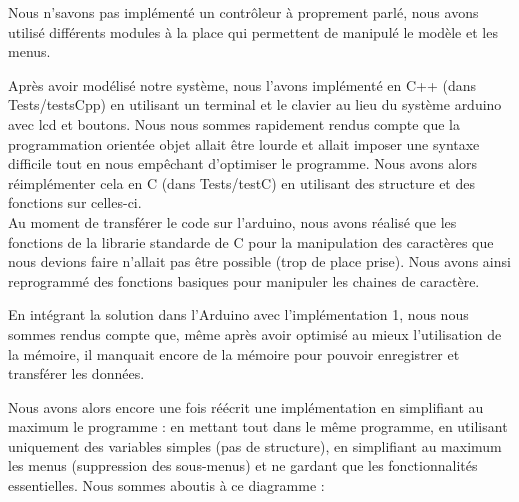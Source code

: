 \documentclass{report}
\begin{document}
Nous n'savons pas implémenté un contrôleur à proprement parlé, nous avons
utilisé différents modules à la place qui permettent de manipulé le
modèle et les menus.

Après avoir modélisé notre système, nous l'avons implémenté en C++ (dans Tests/testsCpp) en
utilisant un terminal et le clavier au lieu du système arduino avec lcd
et boutons. Nous nous sommes rapidement rendus compte que la 
programmation orientée objet allait
être lourde et allait imposer une syntaxe difficile tout en nous empêchant
d'optimiser le programme. Nous avons alors réimplémenter cela en C (dans Tests/testC) en
utilisant des structure et des fonctions sur celles-ci. \\
Au moment de transférer le code sur l'arduino, nous avons réalisé que
les fonctions de la librarie standarde de C pour la manipulation des
caractères que nous devions faire n'allait pas être possible (trop de place
prise). Nous avons ainsi reprogrammé des fonctions basiques pour manipuler
les chaines de caractère.

En intégrant la solution dans l'Arduino avec l'implémentation 1, 
nous nous sommes rendus compte
que, même après avoir optimisé au mieux l'utilisation de la mémoire, il
manquait encore de la mémoire pour pouvoir enregistrer et transférer les
données.

Nous avons alors encore une fois réécrit une implémentation en simplifiant
au maximum le programme : en mettant tout dans le même programme, en
 utilisant uniquement des variables simples (pas de structure), en
 simplifiant au maximum les menus (suppression des sous-menus)
 et ne gardant que les fonctionnalités essentielles. 
 Nous sommes aboutis à ce diagramme :
 
\end{document}
